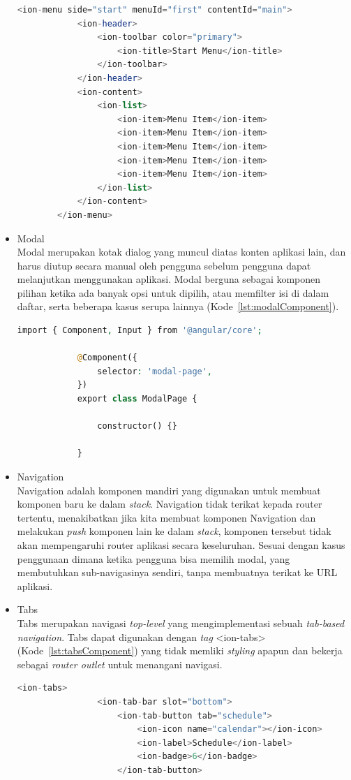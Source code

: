 \begin{itemize}
\newpage

	\begin{lstlisting}[language=php, label={lst:menuComponent}, caption=Potongan Kode Program dari Menu Component]
		<ion-menu side="start" menuId="first" contentId="main">
			<ion-header>
				<ion-toolbar color="primary">
					<ion-title>Start Menu</ion-title>
				</ion-toolbar>
			</ion-header>
			<ion-content>
				<ion-list>
					<ion-item>Menu Item</ion-item>
					<ion-item>Menu Item</ion-item>
					<ion-item>Menu Item</ion-item>
					<ion-item>Menu Item</ion-item>
					<ion-item>Menu Item</ion-item>
				</ion-list>
			</ion-content>
		</ion-menu>
	\end{lstlisting} 
	\item Modal \\
	Modal merupakan kotak dialog yang muncul diatas konten aplikasi lain, dan harus diutup secara manual oleh pengguna sebelum pengguna dapat melanjutkan menggunakan aplikasi. Modal berguna sebagai komponen pilihan ketika ada banyak opsi untuk dipilih, atau memfilter isi di dalam daftar, serta beberapa kasus serupa lainnya (Kode~\ref{lst:modalComponent}).
		\begin{lstlisting}[language=php, label={lst:modalComponent}, caption=Kode Program dari Modal]
			import { Component, Input } from '@angular/core';

			@Component({
			  	selector: 'modal-page',
			})
			export class ModalPage {
			
			  	constructor() {}
			
			}
		\end{lstlisting} 
	\item Navigation \\
	Navigation adalah komponen mandiri yang digunakan untuk membuat komponen baru ke dalam {\it stack}. Navigation tidak terikat kepada router tertentu, menakibatkan jika kita membuat komponen Navigation dan melakukan {\it push} komponen lain ke dalam {\it stack}, komponen tersebut tidak akan mempengaruhi router aplikasi secara keseluruhan. Sesuai dengan kasus penggunaan dimana ketika pengguna bisa memilih modal, yang membutuhkan sub-navigasinya sendiri, tanpa membuatnya terikat ke URL aplikasi. 
	\item Tabs \\
	Tabs merupakan navigasi {\it top-level} yang mengimplementasi sebuah {\it tab-based navigation}. Tabs dapat digunakan dengan {\it tag} <ion-tabs> (Kode~\ref{lst:tabsComponent}) yang tidak memliki {\it styling} apapun dan bekerja sebagai {\it router outlet} untuk menangani navigasi. 
		\begin{lstlisting}[language=php, label={lst:tabsComponent}, caption=Kode Program dari Tabs]
			<ion-tabs>
				<ion-tab-bar slot="bottom">
					<ion-tab-button tab="schedule">
						<ion-icon name="calendar"></ion-icon>
						<ion-label>Schedule</ion-label>
						<ion-badge>6</ion-badge>
					</ion-tab-button>
				

\end{lstlisting}
\end{itemize}
